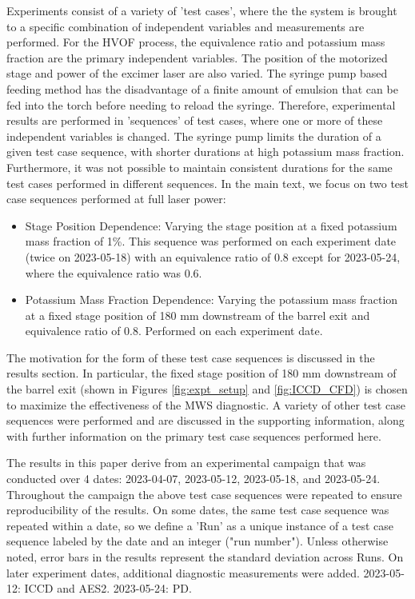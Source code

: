 Experiments consist of a variety of 'test cases', where the the system is brought to a specific combination of independent variables and measurements are performed.   For the HVOF process, the equivalence ratio and potassium mass fraction are the primary independent variables. The position of the motorized stage and power of the excimer laser are also varied.  The syringe pump based feeding method has the disadvantage of a finite amount of emulsion that can be fed into the torch before needing to reload the syringe.  Therefore, experimental results are performed in 'sequences' of test cases, where one or more of these independent variables is changed. The syringe pump limits the duration of a given test case sequence, with shorter durations at high potassium mass fraction. Furthermore, it was not possible to maintain consistent durations for the same test cases performed in different sequences. In the main text, we focus on two test case sequences performed at full laser power:

\begin{itemize}
    \item Stage Position Dependence: Varying the stage position at a fixed potassium mass fraction of 1\%. This sequence was performed on each experiment date (twice on 2023-05-18) with an equivalence ratio of 0.8 except for 2023-05-24, where the equivalence ratio was 0.6.
    \item Potassium Mass Fraction Dependence: Varying the potassium mass fraction at a fixed stage position of 180 mm downstream of the barrel exit and equivalence ratio of 0.8. Performed on each experiment date.
\end{itemize}

The motivation for the form of these test case sequences is discussed in the results section. In particular, the fixed stage position of 180 mm downstream of the barrel exit (shown in Figures \ref{fig:expt_setup} and \ref{fig:ICCD_CFD}) is chosen to maximize the effectiveness of the MWS diagnostic. A variety of other test case sequences were performed and are discussed in the supporting information, along with further information on the primary test case sequences performed here. 

The results in this paper derive from an experimental campaign that was conducted over 4 dates: 2023-04-07, 2023-05-12, 2023-05-18, and 2023-05-24. Throughout the campaign the above test case sequences were repeated to ensure reproducibility of the results.  On some dates, the same test case sequence was repeated within a date, so we define a 'Run' as a unique instance of a test case sequence labeled by the date and an integer ("run number").  Unless otherwise noted, error bars in the results represent the standard deviation across Runs. On later experiment dates, additional diagnostic measurements were added. 2023-05-12: ICCD and AES2. 2023-05-24: PD.


